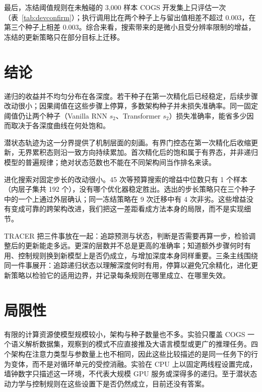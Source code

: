 \documentclass[12pt,a4paper]{article}
\begin{document}
\begin{table}[H]
\centering
\footnotesize
\setlength{\tabcolsep}{2.5pt}
\caption{\textbf{在未触碰数据上的一次性确认。} 官方 COGS 开发集（$n{=}3{,}000$；组聚类配对自助，20{,}000 次重采样），用冻结的预注册阈值与各种子冻结的最佳固定深度只评估一次。计算量比率与留出折的数值（0.2575 / 0.2570 / 0.5212）在种子0--1上到第三位小数一致，种子2相差0.003（相对0.6\%），因此被执行调用层面的节省本身在划分之间以不足百分之一的幅度迁移。}
\label{tab:devconfirm}
\end{table} 最后，冻结阈值规则在未触碰的 3{,}000 样本 COGS 开发集上只评估一次（表~\ref{tab:devconfirm}）；执行调用比在两个种子上与留出值相差不超过 0.003，在第三个种子上相差 0.003。综合来看，搜索带来的是微小且受分辨率限制的增益，冻结的更新策略只在部分目标上迁移。

\section{结论}
\label{sec:conclusion}

递归的收益并不均匀分布在各深度。若干种子在第一次精化后已经稳定，后续步骤改动很小；因果阈值在这些步骤上停算，多数架构种子并未损失准确率。同一固定阈值仍让两个种子（Vanilla RNN $s_2$、Transformer $s_2$）损失准确率，能省多少因而取决于各深度曲线在何处饱和。

潜状态轨迹为这一分界提供了机制层面的刻画。有界门控态在第一次精化后收缩更新，无界累积态则沿一致方向持续累加。首次精化后的饱和属于有界态，并非递归模型的普遍规律；绝对状态范数也不能在不同架构间当作排名来读。

进化搜索对固定步长的改动很小。45 次等预算搜索的增益中位数只有 1 个样本（内层子集共 192 个），没有哪个优化器稳定胜出。选出的步长策略只在三个种子中的一个上通过外层确认；同一冻结策略在 9 次迁移中有 4 次非劣。这些增益没有变成可靠的跨架构改进，我们把这一差距看成方法本身的局限，而不是实现细节。

TRACER 把三件事放在一起：追踪预测与状态，判断是否需要再算一步，检验调整后的更新能走多远。更深的层数并不总是更高的准确率；知道额外步骤何时有用、控制规则换到新模型上是否仍成立，与增加深度本身同样重要。三条主线围绕同一件事展开：追踪递归状态以理解深度何时有用，停算以避免冗余精化，进化更新策略以检验它的适用边界，并记录每条规则在哪里成立、在哪里失效。

\section*{局限性}
有限的计算资源使模型规模较小，架构与种子数量也不多。实验只覆盖 COGS 一个语义解析数据集，观察到的模式不应直接推及大语言模型或更广的推理任务。四个架构在注意力类型与参数量上也不相同，因此这些比较描述的是同一任务下的行为变体，而不是对循环单元的受控消融。实验在 CPU 上以固定两线程设置完成，墙钟数字只描述这一环境，不代表大规模 GPU 服务或深得多的递归。至于潜状态动力学与控制规则在这些设置下是否仍然成立，目前还没有答案。



\end{document}
